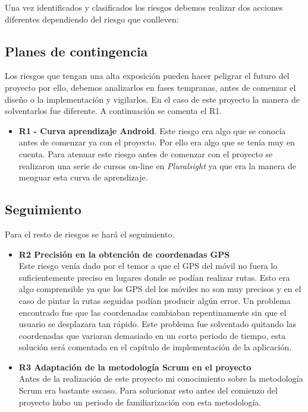 	
Una vez identificados y clasificados los riesgos debemos realizar dos acciones diferentes dependiendo del riesgo que conlleven:
\subsection{Planes de contingencia} 

Los riesgos que tengan una alta exposición pueden hacer peligrar el futuro del proyecto por ello,  debemos analizarlos en fases tempranas, antes
de comenzar el diseño o la implementación y vigilarlos. En el caso de este proyecto la manera de solventarlos fue diferente.  A continuación se comenta el R1.

 

\begin{itemize}
\item \textbf{R1} \textbf{- Curva aprendizaje Android}. Este riesgo era algo que se conocía antes de comenzar ya con el proyecto. Por ello era algo que se tenía  muy en cuenta. Para atenuar este riesgo antes de comenzar  con el proyecto se realizaron una serie de cursos on-line en \textit{Pluralsight} ya que era la manera de menguar esta curva de aprendizaje.






	
\end{itemize}

\subsection{Seguimiento} 	
	Para el resto de riesgos se hará el seguimiento.
	\begin{itemize}
	\item\textbf{ R2 Precisión en la obtención de coordenadas GPS}\\
	Este riesgo venía dado por el temor a que el GPS del móvil no fuera lo suficientemente preciso en  lugares donde se podían realizar rutas. Esto era algo comprensible ya que los GPS del los móviles no son muy precisos y en el caso de pintar la rutas seguidas podían producir algún error. Un problema encontrado fue que las coordenadas cambiaban repentinamente sin que el usuario se desplazara tan rápido. Este problema fue solventado quitando las coordenadas que variaran demasiado en un corto periodo de tiempo, esta solución será comentada en el capítulo de implementación de la aplicación.


\item \textbf{R3 Adaptación de la metodología Scrum en el proyecto}\\
Antes de la realización de este proyecto mi conocimiento sobre la metodología Scrum era bastante escaso. Para solucionar esto antes del comienzo del proyecto hubo un periodo de familiarización con esta metodología. 

	\end{itemize}